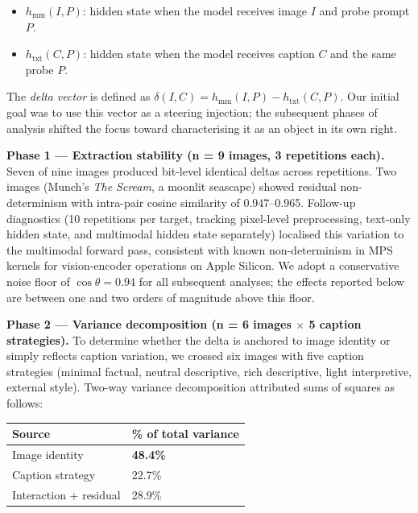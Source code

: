 \documentclass[11pt,a4paper]{article}
\begin{document}
\begin{itemize}[leftmargin=*]
  \item $h_{\text{mm}}(I, P)$: hidden state when the model receives image $I$ and probe prompt $P$.
  \item $h_{\text{txt}}(C, P)$: hidden state when the model receives caption $C$ and the same probe $P$.
\end{itemize}

The \emph{delta vector} is defined as $\delta(I, C) = h_{\text{mm}}(I, P) - h_{\text{txt}}(C, P)$. Our initial goal was to use this vector as a steering injection; the subsequent phases of analysis shifted the focus toward characterising it as an object in its own right.

\textbf{Phase 1 --- Extraction stability (n = 9 images, 3 repetitions each).} Seven of nine images produced bit-level identical deltas across repetitions. Two images (Munch's \emph{The Scream}, a moonlit seascape) showed residual non-determinism with intra-pair cosine similarity of 0.947--0.965. Follow-up diagnostics (10 repetitions per target, tracking pixel-level preprocessing, text-only hidden state, and multimodal hidden state separately) localised this variation to the multimodal forward pass, consistent with known non-determinism in MPS kernels for vision-encoder operations on Apple Silicon. We adopt a conservative noise floor of $\cos \theta = 0.94$ for all subsequent analyses; the effects reported below are between one and two orders of magnitude above this floor.

\textbf{Phase 2 --- Variance decomposition (n = 6 images \ensuremath{\times} 5 caption strategies).} To determine whether the delta is anchored to image identity or simply reflects caption variation, we crossed six images with five caption strategies (minimal factual, neutral descriptive, rich descriptive, light interpretive, external style). Two-way variance decomposition attributed sums of squares as follows:

\begin{center}
\begin{tabular}{ll}
\toprule
Source & \% of total variance \\
\midrule
Image identity & \textbf{48.4\%} \\
Caption strategy & 22.7\% \\
Interaction + residual & 28.9\% \\
\bottomrule
\end{tabular}
\end{center}
\end{document}
